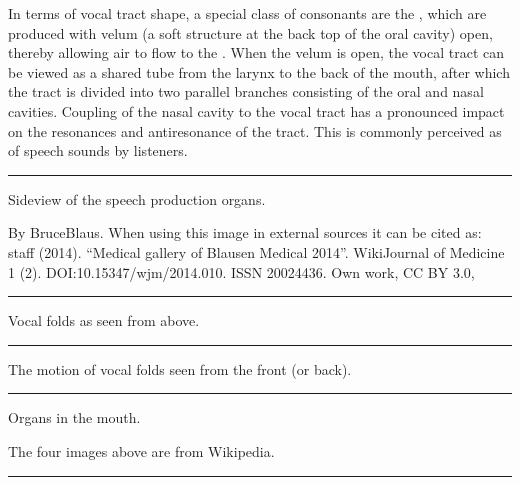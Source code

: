 \documentclass[letterpaper,10pt,english]{jupyterBook}
\begin{document}
\sphinxAtStartPar
In terms of vocal tract shape, a special class of consonants are the
, which are produced with velum (a soft structure at the back
top of the oral cavity) open, thereby allowing air to flow to the . When the velum is open, the vocal tract can be viewed as a
shared tube from the larynx to the back of the mouth, after which the
tract is divided into two parallel branches consisting of the oral and
nasal cavities. Coupling of the nasal cavity to the vocal tract has a
pronounced impact on the resonances and anti\sphinxhyphen{}resonance of the tract.
This is commonly perceived as  of speech sounds by
listeners.


\bigskip\hrule\bigskip


\sphinxAtStartPar
Side\sphinxhyphen{}view of the speech production organs.

\sphinxAtStartPar
{}

\sphinxAtStartPar
By BruceBlaus. When using this image in external sources it can be cited as: staff (2014). “Medical gallery
of Blausen Medical 2014”. WikiJournal of Medicine 1 (2).
DOI:10.15347/wjm/2014.010. ISSN 2002\sphinxhyphen{}4436. \sphinxhyphen{} Own work, CC BY 3.0,


\bigskip\hrule\bigskip


\sphinxAtStartPar
Vocal folds as seen from above.

\sphinxAtStartPar
{}


\bigskip\hrule\bigskip


\sphinxAtStartPar
The motion of vocal folds seen from the front (or back).

\sphinxAtStartPar
{}


\bigskip\hrule\bigskip


\sphinxAtStartPar
Organs in the mouth.

\sphinxAtStartPar
{}

\sphinxAtStartPar
The four images above are from Wikipedia.


\bigskip\hrule\bigskip
\end{document}

